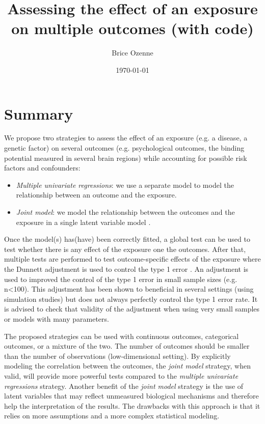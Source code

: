 \documentclass{article}
\author{Brice Ozenne}
\date{\today}
\title{Assessing the effect of an exposure on multiple outcomes (with \Rlogo{} code)}
\begin{document}
\maketitle

\section*{Summary}
\label{sec:org719aa51}
We propose two strategies to assess the effect of an exposure (e.g. a
disease, a genetic factor) on several outcomes (e.g. psychological
outcomes, the binding potential measured in several brain regions)
while accounting for possible risk factors and confounders:
\begin{itemize}
\item \emph{Multiple univariate regressions}: we use a separate model to model
the relationship between an outcome and the exposure.
\item \emph{Joint model}: we model the relationship between the outcomes and
the exposure in a single latent variable model
\citep{holst2013linear}.
\end{itemize}
Once the model(s) has(have) been correctly fitted, a global test can
  be used to test whether there is any effect of the exposure one the
  outcomes. After that, multiple tests are performed to test
  outcome-specific effects of the exposure where the Dunnett
  adjustment is used to control the type 1 error
  \citep{pipper2012versatile}. An adjustment is used to improved the
  control of the type 1 error in small sample sizes (e.g. n<100). This
  adjustment has been shown to beneficial in several settings (using
  simulation studies) but does not always perfectly control the type 1
  error rate. It is advised to check that validity of the adjustment
  when using very small samples or models with many parameters.

\bigskip

The proposed strategies can be used with continuous outcomes,
  categorical outcomes, or a mixture of the two. The number of
  outcomes should be smaller than the number of observations
  (low-dimensional setting). By explicitly modeling the correlation
  between the outcomes, the \emph{joint model} strategy, when valid, will
  provide more powerful tests compared to the \emph{multiple univariate
  regressions} strategy. Another benefit of the \emph{joint model} strategy
  is the use of latent variables that may reflect unmeasured
  biological mechanisms and therefore help the interpretation of the
  results. The drawbacks with this approach is that it relies on more
  assumptions and a more complex statistical modeling.
\end{document}
